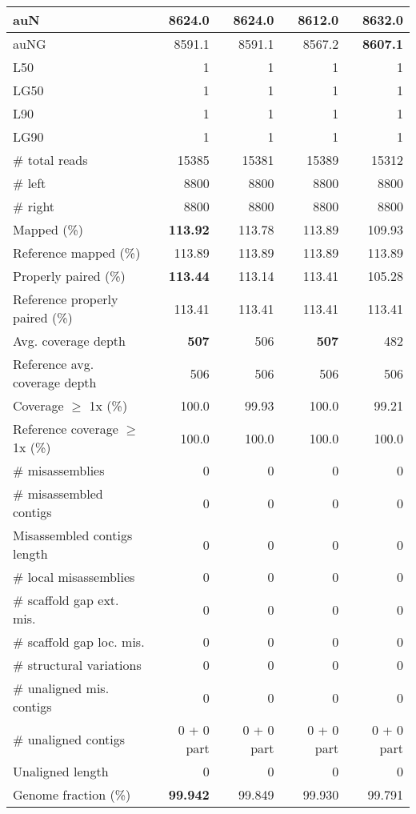 \documentclass[12pt,a4paper]{article}
\begin{document}
\begin{table}[ht]
\begin{center}
\begin{tabular}{|l*{4}{|r}|}
auN & 8624.0 & 8624.0 & 8612.0 & {\bf 8632.0} \\ \hline
auNG & 8591.1 & 8591.1 & 8567.2 & {\bf 8607.1} \\ \hline
L50 & 1 & 1 & 1 & 1 \\ \hline
LG50 & 1 & 1 & 1 & 1 \\ \hline
L90 & 1 & 1 & 1 & 1 \\ \hline
LG90 & 1 & 1 & 1 & 1 \\ \hline
\# total reads & 15385 & 15381 & 15389 & 15312 \\ \hline
\# left & 8800 & 8800 & 8800 & 8800 \\ \hline
\# right & 8800 & 8800 & 8800 & 8800 \\ \hline
Mapped (\%) & {\bf 113.92} & 113.78 & 113.89 & 109.93 \\ \hline
Reference mapped (\%) & 113.89 & 113.89 & 113.89 & 113.89 \\ \hline
Properly paired (\%) & {\bf 113.44} & 113.14 & 113.41 & 105.28 \\ \hline
Reference properly paired (\%) & 113.41 & 113.41 & 113.41 & 113.41 \\ \hline
Avg. coverage depth & {\bf 507} & 506 & {\bf 507} & 482 \\ \hline
Reference avg. coverage depth & 506 & 506 & 506 & 506 \\ \hline
Coverage $\geq$ 1x (\%) & 100.0 & 99.93 & 100.0 & 99.21 \\ \hline
Reference coverage $\geq$ 1x (\%) & 100.0 & 100.0 & 100.0 & 100.0 \\ \hline
\# misassemblies & 0 & 0 & 0 & 0 \\ \hline
\# misassembled contigs & 0 & 0 & 0 & 0 \\ \hline
Misassembled contigs length & 0 & 0 & 0 & 0 \\ \hline
\# local misassemblies & 0 & 0 & 0 & 0 \\ \hline
\# scaffold gap ext. mis. & 0 & 0 & 0 & 0 \\ \hline
\# scaffold gap loc. mis. & 0 & 0 & 0 & 0 \\ \hline
\# structural variations & 0 & 0 & 0 & 0 \\ \hline
\# unaligned mis. contigs & 0 & 0 & 0 & 0 \\ \hline
\# unaligned contigs & 0 + 0 part & 0 + 0 part & 0 + 0 part & 0 + 0 part \\ \hline
Unaligned length & 0 & 0 & 0 & 0 \\ \hline
Genome fraction (\%) & {\bf 99.942} & 99.849 & 99.930 & 99.791 \\ \hline

\end{tabular}
\end{center}
\end{table}
\end{document}
